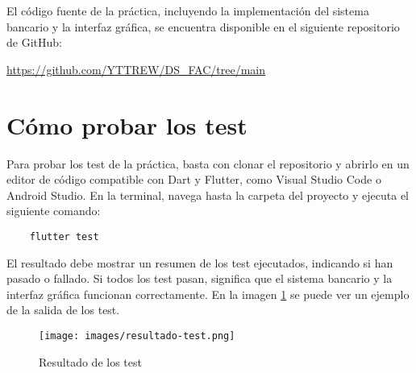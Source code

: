 \documentclass[12pt]{article}
\begin{document}
El código fuente de la práctica, incluyendo la implementación del sistema bancario y la interfaz gráfica, se encuentra disponible en el siguiente repositorio de GitHub:

\url{https://github.com/YTTREW/DS_FAC/tree/main}

\section{Cómo probar los test}

Para probar los test de la práctica, basta con clonar el repositorio y abrirlo en un editor de código compatible con Dart y Flutter, como Visual Studio Code o Android Studio. En la terminal, navega hasta la carpeta del proyecto y ejecuta el siguiente comando:

\begin{verbatim}
    flutter test
\end{verbatim}

El resultado debe mostrar un resumen de los test ejecutados, indicando si han pasado o fallado. Si todos los test pasan, significa que el sistema bancario y la interfaz gráfica funcionan correctamente. En la imagen \ref{fig:resultado-test} se puede ver un ejemplo de la salida de los test.

\begin{figure}[H]
    \centering
    \texttt{[image: images/resultado-test.png]}
    \caption{Resultado de los test}
    \label{fig:resultado-test}
\end{figure}
\end{document}

